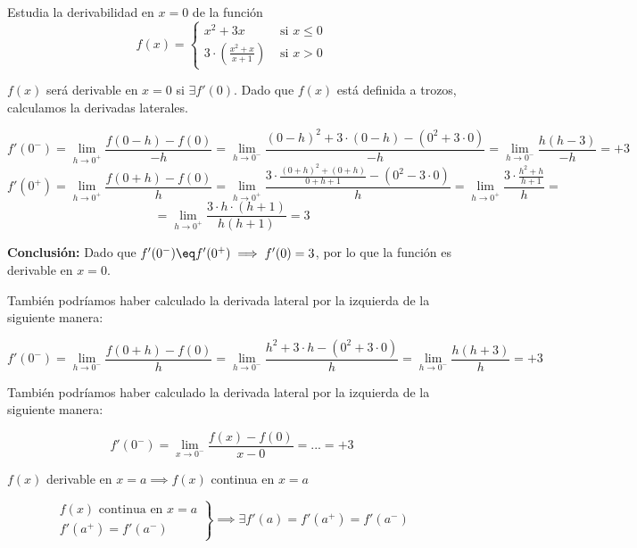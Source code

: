 \begin{problem} Estudia la derivabilidad en $x=0$ de la función 
\label{prb::derivab1}
\[f(x) = \begin{cases} x^2+3x & \text{ si } x\leq 0\\ 3·\left(\frac{x^2+x}{x+1}\right)&\text{ si } x>0\end{cases}\]
\solution

$f(x)$ será derivable en $x=0$ si $\exists f'(0)$. Dado que $f(x)$ está definida a trozos, calculamos la derivadas laterales.

\[f'(0^-) = \lim_{h\to 0^+} \frac{f(0-h)-f(0)}{-h} = \lim_{h\to 0^-} \frac{(0-h)^2+3·(0-h)-(0^2+3·0)}{-h} = \lim_{h\to 0^-} \frac{h(h-3)}{-h} = +3\]
\[f'(0^+) = \lim_{h\to 0^+} \frac{f(0+h)-f(0)}{h} = \lim_{h\to 0^+} \frac{3·\frac{(0+h)^2+(0+h)}{0+h+1} - (0^2-3·0)}{h} = \lim_{h\to 0^+} \frac{3·\frac{h^2+h}{h+1}}{h} = \]
\[=\lim_{h\to 0^+} \frac{3·h·(h+1)}{h(h+1)} = 3 \]

\textbf{Conclusión:} Dado que  $f'(0^-) \eq f'(0^+) \implies f'(0) = 3$, por lo que la función es derivable en $x=0$.


\obs También podríamos haber calculado la derivada lateral por la izquierda de la siguiente manera:

\[f'(0^-) = \lim_{h\to 0^-} \frac{f(0+h)-f(0)}{h} = \lim_{h\to 0^-} \frac{h^2+3·h-(0^2+3·0)}{h} = \lim_{h\to 0^-} \frac{h(h+3)}{h} = +3\]

\obs También podríamos haber calculado la derivada lateral por la izquierda de la siguiente manera:

\[f'(0^-) = \lim_{x\to 0^-} \frac{f(x)-f(0)}{x-0} = ... = +3\]


\end{problem}

\begin{prop}
$f(x)$ derivable en $x=a \implies f(x)$ continua en $x=a$
\end{prop}


\begin{prop}
\[
\left.\begin{array}{c}
f(x) \text{ continua en } x=a\\
f'(a^+) = f'(a^-)\end{array}\right\}\implies \exists f'(a) = f'(a^+) = f'(a^-)
\]
\end{prop}


